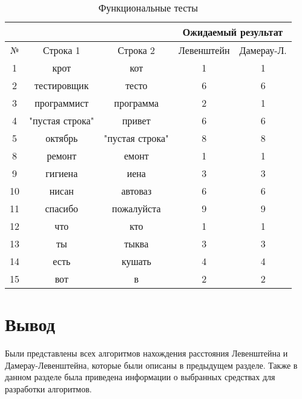 \begin{table}[h]
	\begin{center}
        \begin{threeparttable}
        \captionsetup{justification=raggedleft,singlelinecheck=off}
		\caption{\label{tbl:functional_test} Функциональные тесты}
		\begin{tabular}{|c|c|c|c|c|}
			\hline
			& & & \multicolumn{2}{c|}{Ожидаемый результат} \\
			\hline
			№&Строка 1&Строка 2&Левенштейн&Дамерау-Л. \\
			\hline
			1&крот&кот&1&1 \\
			\hline
			2&тестировщик&тесто&6&6 \\
			\hline
			3&программист&программа&2&1 \\
			\hline
			4&"пустая строка"&привет&6&6 \\
			\hline
			5&октябрь&"пустая строка"&8&8 \\
			\hline
			8&ремонт&емонт&1&1 \\
			\hline
			9&гигиена&иена&3&3 \\
			\hline
            10&нисан&автоваз&6&6 \\
			\hline
			11&спасибо&пожалуйста&9&9 \\
			\hline
            12&что&кто&1&1 \\
			\hline
            13&ты&тыква&3&3 \\
			\hline
            14&есть&кушать&4&4 \\
			\hline
            15&вот&в&2&2 \\
			\hline
		\end{tabular}
        \end{threeparttable}
	\end{center}
\end{table}

\section*{Вывод}

Были представлены всех алгоритмов нахождения расстояния Левенштейна и Дамерау-Левенштейна, которые были описаны в предыдущем разделе. Также в данном разделе была приведена информации о выбранных средствах для разработки алгоритмов.
